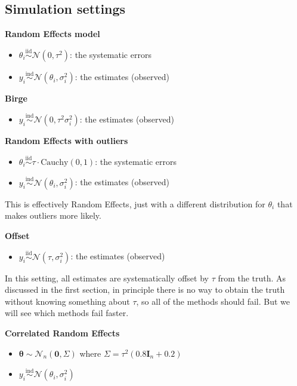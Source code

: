 \documentclass[letterpaper,12pt]{article}
\begin{document}
\subsection{Simulation settings}\label{simulation-settings}

\textbf{Random Effects model}

\begin{itemize}
\item
  $\theta_i\overset{\mathrm{iid}}{\sim}\mathcal{N}(0,\tau^2)$: the systematic errors
\item
  $y_i\overset{\mathrm{ind}}{\sim}\mathcal{N}(\theta_i,\sigma_i^2)$: the estimates (observed)
\end{itemize}

\textbf{Birge}

\begin{itemize}

\item
  $y_i\overset{\mathrm{ind}}{\sim}\mathcal{N}(0,\tau^2\sigma_i^2)$: the estimates (observed)
\end{itemize}

\textbf{Random Effects with outliers}

\begin{itemize}
\item
  $\theta_i\overset{\mathrm{iid}}{\sim}\tau\cdot \mathrm{Cauchy}(0,1)$: the systematic errors
\item
  $y_i\overset{\mathrm{ind}}{\sim}\mathcal{N}(\theta_i,\sigma_i^2)$: the estimates (observed)
\end{itemize}

This is effectively Random Effects, just with a different distribution for $\theta_i$ that makes outliers more likely.

\textbf{Offset}

\begin{itemize}

\item
  $y_i\overset{\mathrm{iid}}{\sim}\mathcal{N}(\tau,\sigma_i^2)$: the estimates (observed)
\end{itemize}

In this setting, all estimates are systematically offset by $\tau$ from the truth. As discussed in the first section, in principle there is no way to obtain the truth without knowing something about $\tau$, so all of the methods should fail. But we will see which methods fail faster.

\textbf{Correlated Random Effects}

\begin{itemize}
\item
  $\boldsymbol{\theta}\sim \mathcal{N}_n(\mathbf{0},\Sigma)$ where $\Sigma=\tau^2(0.8\mathbf{I}_n+0.2)$
\item
  $y_i\overset{\mathrm{ind}}{\sim}\mathcal{N}(\theta_i,\sigma_i^2)$
\end{itemize}
\end{document}
